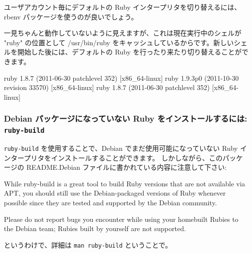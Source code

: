 \documentclass[mingoth,a4paper]{jsarticle}
\begin{document}
ユーザアカウント毎にデフォルトの Ruby インタープリタを切り替えるには、rbenv パッケージを使うのが良いでしょう。
一見ちゃんと動作していないように見えますが、これは現在実行中のシェルが "ruby" の位置として /usr/bin/ruby をキャッシュしているからです。新しいシェルを開始した後には、デフォルトの Ruby を行ったり来たり切り替えることができます。
\begin{commandline}
ruby 1.8.7 (2011-06-30 patchlevel 352) [x86_64-linux]
ruby 1.9.3p0 (2011-10-30 revision 33570) [x86_64-linux]
ruby 1.8.7 (2011-06-30 patchlevel 352) [x86_64-linux]
\end{commandline}

\subsubsection{Debian パッケージになっていない Ruby をインストールするには: \texttt{ruby-build}}

\texttt{ruby-build} を使用することで、Debian でまだ使用可能になっていない Ruby インタープリタをインストールすることができます。
しかしながら、このパッケージの README.Debian ファイルに書かれている内容に注意して下さい:
\begin{commandline}
  While ruby-build is a great tool to build Ruby versions that are not
  available via APT, you should still use the Debian-packaged versions
  of Ruby whenever possible since they are tested and supported by the
  Debian community.

  Please do not report bugs you encounter while using your homebuilt
  Rubies to the Debian team; Rubies built by yourself are not supported.
\end{commandline}
というわけで、詳細は \texttt{man ruby-build} ということで。
\end{document}
